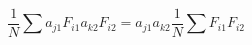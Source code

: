 \begin{equation}
	\frac{1}{N}\sum a_{j1}F_{i1} a_{k2}F_{i2} = a_{j1}a_{k2}\frac{1}{N}\sum F_{i1}F_{i2}
\end{equation}
